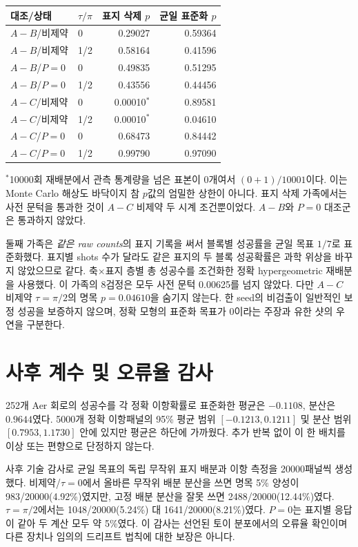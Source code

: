 \documentclass[11pt,a4paper]{article}
\begin{document}
\begin{center}
\begin{tabular}{@{}llrr@{}}
\toprule
대조/상태 & $\tau/\pi$ & 표지 삭제 $p$ & 균일 표준화 $p$ \\
\midrule
$A-B$/비제약 & 0 & 0.29027 & 0.59364 \\
$A-B$/비제약 & 1/2 & 0.58164 & 0.41596 \\
$A-B$/$P=0$ & 0 & 0.49835 & 0.51295 \\
$A-B$/$P=0$ & 1/2 & 0.43556 & 0.44456 \\
$A-C$/비제약 & 0 & 0.00010$^{*}$ & 0.89581 \\
$A-C$/비제약 & 1/2 & 0.00010$^{*}$ & 0.04610 \\
$A-C$/$P=0$ & 0 & 0.68473 & 0.84442 \\
$A-C$/$P=0$ & 1/2 & 0.99790 & 0.97090 \\
\bottomrule
\end{tabular}
\end{center}

$^{*}$10000회 재배분에서 관측 통계량을 넘은 표본이 0개여서
$(0+1)/10001$이다. 이는 Monte Carlo 해상도 바닥이지
참 $p$값의 엄밀한 상한이 아니다.
표지 삭제 가족에서는 사전 문턱을 통과한 것이 $A-C$ 비제약
두 시계 조건뿐이었다. $A-B$와 $P=0$ 대조군은 통과하지 않았다.

둘째 가족은 \emph{같은 raw counts}의 표지 기록을 써서
블록별 성공률을 균일 목표 $1/7$로 표준화했다. 표지별 shots
수가 달라도 같은 표지의 두 블록 성공확률은 과학 위상을
바꾸지 않았으므로 같다. 축$\times$표지 층별 총 성공수를
조건화한 정확 hypergeometric 재배분을 사용했다.
이 가족의 8검정은 모두 사전 문턱 0.00625를 넘지 않았다.
다만 $A-C$ 비제약 $\tau=\pi/2$의 명목 $p=0.04610$을
숨기지 않는다. 한 seed의 비검출이 일반적인 보정 성공을
보증하지 않으며, 정확 모형의 표준화 목표가 0이라는 주장과
유한 샷의 우연을 구분한다.

\section{사후 계수 및 오류율 감사}
252개 Aer 회로의 성공수를 각 정확 이항확률로 표준화한 평균은
$-0.1108$, 분산은 $0.9644$였다. 5000개 정확 이항패널의
95\% 평균 범위 $[-0.1213,0.1211]$ 및 분산 범위
$[0.7953,1.1730]$ 안에 있지만 평균은 하단에 가까웠다.
추가 반복 없이 이 한 배치를 이상 또는 편향으로 단정하지 않는다.

사후 기술 감사로 균일 목표의 독립 무작위 표지 배분과 이항
측정을 20000패널씩 생성했다. 비제약/$\tau=0$에서
올바른 무작위 배분 분산을 쓰면 명목 5\% 양성이
983/20000(4.92\%)였지만, 고정 배분 분산을 잘못 쓰면
2488/20000(12.44\%)였다. $\tau=\pi/2$에서는
1048/20000(5.24\%) 대 1641/20000(8.21\%)였다.
$P=0$는 표지별 응답이 같아 두 계산 모두 약 5\%였다.
이 감사는 선언된 토이 분포에서의 오류율 확인이며 다른
장치나 임의의 드리프트 법칙에 대한 보장은 아니다.
\end{document}
